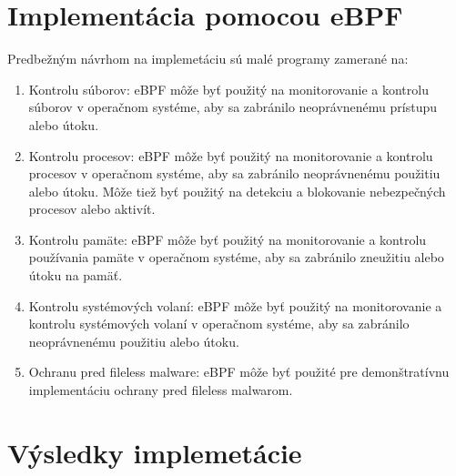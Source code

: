 \section{Implementácia pomocou eBPF}
Predbežným návrhom na implemetáciu sú malé programy zamerané na:
\begin{enumerate}
    \item Kontrolu súborov: eBPF môže byť použitý na monitorovanie a kontrolu súborov v operačnom systéme, aby sa zabránilo 
    neoprávnenému prístupu alebo útoku.
    \item Kontrolu procesov: eBPF môže byť použitý na monitorovanie a kontrolu procesov v operačnom systéme, aby sa zabránilo 
    neoprávnenému použitiu alebo útoku. Môže tiež byť použitý na detekciu a blokovanie nebezpečných procesov alebo aktivít.
    \item Kontrolu pamäte: eBPF môže byť použitý na monitorovanie a kontrolu používania pamäte v operačnom systéme, aby sa zabránilo zneužitiu 
    alebo útoku na pamäť.
    \item Kontrolu systémových volaní: eBPF môže byť použitý na monitorovanie a kontrolu systémových volaní v operačnom systéme, 
    aby sa zabránilo neoprávnenému použitiu alebo útoku.
    \item Ochranu pred fileless malware: eBPF môže byť použité pre demonštratívnu implementáciu ochrany pred fileless malwarom.
\end{enumerate}

\section{Výsledky implemetácie}












